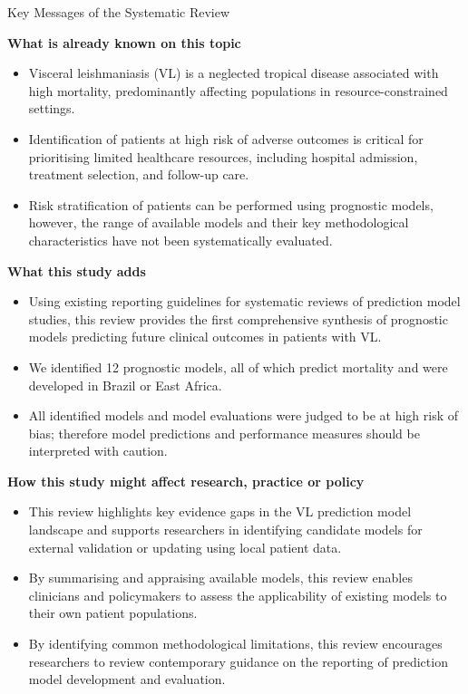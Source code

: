 \begin{mybox}[label=box:bmj_sys_rev]{Key Messages of the Systematic Review}
  {
    \textbf{What is already known on this topic}
    \begin{itemize}[noitemsep]
      \item Visceral leishmaniasis (VL) is a neglected tropical disease associated with high mortality, predominantly affecting populations in resource-constrained settings.
      \item Identification of patients at high risk of adverse outcomes is critical for prioritising limited healthcare resources, including hospital admission, treatment selection, and follow-up care.
      \item Risk stratification of patients can be performed using prognostic models, however, the range of available models and their key methodological characteristics have not been systematically evaluated.
    \end{itemize}
    \textbf{What this study adds}
    \begin{itemize}[noitemsep]
      \item Using existing reporting guidelines for systematic reviews of prediction model studies, this review provides the first comprehensive synthesis of prognostic models predicting future clinical outcomes in patients with VL.
      \item We identified 12 prognostic models, all of which predict mortality and were developed in Brazil or East Africa.
      \item All identified models and model evaluations were judged to be at high risk of bias; therefore model predictions and performance measures should be interpreted with caution.
    \end{itemize}
    \textbf{How this study might affect research, practice or policy}
    \begin{itemize}[noitemsep]
      \item This review highlights key evidence gaps in the VL prediction model landscape and supports researchers in identifying candidate models for external validation or updating using local patient data.
      \item By summarising and appraising available models, this review enables clinicians and policymakers to assess the applicability of existing models to their own patient populations.
      \item By identifying common methodological limitations, this review encourages researchers to review contemporary guidance on the reporting of prediction model development and evaluation.
    \end{itemize}
  }
\end{mybox}

